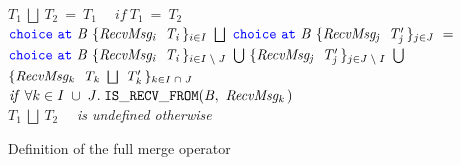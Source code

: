 \documentclass[12pt,twoside]{report}
\begin{document}
\begin{figure}[h]

    \centering

    $\mathit{T_1}\ \bigsqcup\ \mathit{T_2}\ =\ \mathit{T_1} \quad \; \mathit{if}\ \mathit{T_1}\ =\ \mathit{T_2}$\\[17pt]

    $\choice\ \at\ \mathit{B}\ \{\mathit{RecvMsg_i}\ \;\mathit{T_i}\,\}_\varinset{i}{I}\ \bigsqcup\ \choice\ \at\ \mathit{B}\ \{\mathit{RecvMsg_j}\ \;\mathit{T'_j}\,\}_\varinset{j}{J}\ =$\\[5pt]
    $\choice\ \at\ \mathit{B}\ \{\mathit{RecvMsg_i}\ \;\mathit{T_i}\,\}_\varinset{i}{I\;\setminus\;J}\ \bigcup\ \{\mathit{RecvMsg_j}\ \;\mathit{T'_j}\,\}_\varinset{j}{J\;\setminus\;I}\ \bigcup$\\
     $\{\mathit{RecvMsg_k}\;\ \mathit{T_k}\ \bigsqcup\ \mathit{T'_k}\,\}_\varinset{k}{I\;\cap\;J}$\\[7.5pt]


    $\mathit{if}\ \forall \varinset{k}{I\;\cup\;J}.\;\mathtt{IS\_RECV\_FROM}(\mathit{B},\ \mathit{RecvMsg_k\,})$\\[14pt]




     $\mathit{T_1}\ \bigsqcup\ \mathit{T_2}$ \ \ \textit{is undefined otherwise}\\[7.5pt]

    \caption{Definition of the full merge operator}
    \label{fullmerge}
\end{figure}
\end{document}
